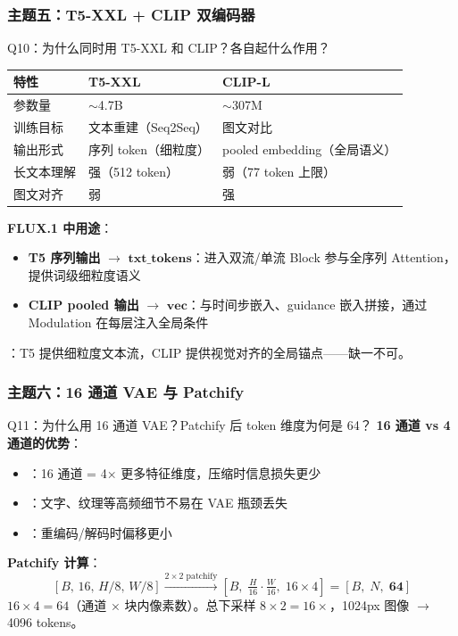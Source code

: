 \subsubsection{主题五：T5-XXL + CLIP 双编码器}

\begin{conceptbox}{Q10：为什么同时用 T5-XXL 和 CLIP？各自起什么作用？}
\begin{center}
\small
\begin{tabular}{|l|l|l|}
\hline
\textbf{特性} & \textbf{T5-XXL} & \textbf{CLIP-L} \\
\hline
参数量 & $\sim$4.7B & $\sim$307M \\
训练目标 & 文本重建（Seq2Seq） & 图文对比 \\
输出形式 & 序列 token（细粒度） & pooled embedding（全局语义）\\
长文本理解 & 强（512 token） & 弱（77 token 上限）\\
图文对齐 & 弱 & 强 \\
\hline
\end{tabular}
\end{center}

\textbf{FLUX.1 中用途}：
\begin{itemize}
  \item \textbf{T5 序列输出} $\to$ $\mathbf{txt\_tokens}$：进入双流/单流 Block 参与全序列 Attention，提供词级细粒度语义
  \item \textbf{CLIP pooled 输出} $\to$ $\mathbf{vec}$：与时间步嵌入、guidance 嵌入拼接，通过 Modulation 在每层注入全局条件
\end{itemize}

：T5 提供细粒度文本流，CLIP 提供视觉对齐的全局锚点——缺一不可。
\end{conceptbox}

\subsubsection{主题六：16 通道 VAE 与 Patchify}

\begin{conceptbox}{Q11：为什么用 16 通道 VAE？Patchify 后 token 维度为何是 64？}
\textbf{16 通道 vs 4 通道的优势}：
\begin{itemize}
  \item {}：16 通道 = 4× 更多特征维度，压缩时信息损失更少
  \item {}：文字、纹理等高频细节不易在 VAE 瓶颈丢失
  \item {}：重编码/解码时偏移更小
\end{itemize}

\textbf{Patchify 计算}：
\[
[B,\, 16,\, H/8,\, W/8] \xrightarrow{2\times2\text{ patchify}} [B,\; \tfrac{H}{16}\cdot\tfrac{W}{16},\; 16\times4] = [B,\; N,\; \mathbf{64}]
\]
$16 \times 4 = 64$（通道 × 块内像素数）。总下采样 $8 \times 2 = 16\times$，1024px 图像 $\to$ 4096 tokens。

\end{conceptbox}

